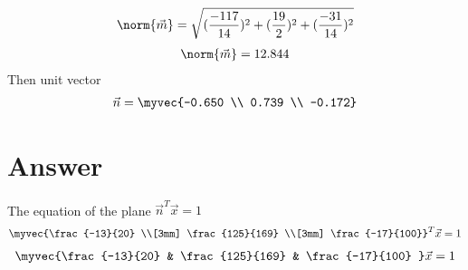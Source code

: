 \documentclass[journal,12pt,twocolumn]{IEEEtran}
\begin{document}
\begin{align}
	\norm{\vec{m}} = \sqrt{(\frac{-117}{14})^2+(\frac{19}{2})^2+ (\frac{-31}{14})^2} 
\end{align}
\begin{align}
	\norm{\vec{m}} = 12.844
\end{align}
Then unit vector\\
\begin{align}
 \vec{n} = \myvec{-0.650 \\ 0.739 \\ -0.172}
\end{align}
\section{Answer}
The equation of the plane $ \vec{n}^T\vec{x} = 1 $
\begin{align}
	\myvec{\frac{-13}{20} \\[3mm] \frac{125}{169} \\[3mm] \frac{-17}{100}}^T \vec{x} = 1
\end{align}
\begin{align}
	\myvec{\frac{-13}{20} &  \frac{125}{169} & \frac{-17}{100} }\vec{x} = 1
\end{align}
\end{document}
